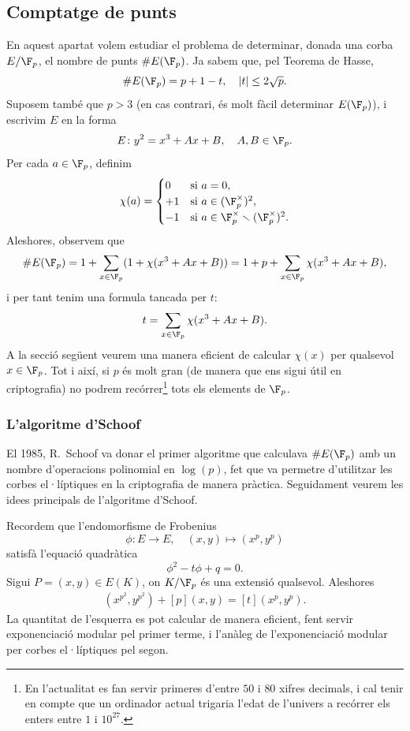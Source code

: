  \subsection{Comptatge de punts}
 En aquest apartat volem estudiar el problema de determinar, donada una corba $E/\F_p$, el nombre de punts $\# E(\F_p)$. Ja sabem que, pel Teorema de Hasse,
 \[
 \# E(\F_p) = p + 1 - t,\quad |t|\leq 2\sqrt{p}.
 \]
 Suposem també que $p>3$ (en cas contrari, és molt fàcil determinar $E(\F_p)$), i escrivim $E$ en la forma
 \[
 E\colon y^2=x^3+Ax+B, \quad A,B\in\F_p.
 \]
 Per cada $a\in \F_p$, definim
 \[
 \chi(a)=\begin{cases}
 0&\text{si } a=0,\\
 +1&\text{si } a\in(\F_p^\times)^2,\\
 -1&\text{si } a\in \F_p^\times\smallsetminus (\F_p^\times)^2.
 \end{cases}
 \]
 Aleshores, observem que
 \[
 \# E(\F_p) = 1+ \sum_{x\in\F_p} (1+\chi(x^3+Ax+B))= 1+p+\sum_{x\in\F_p} \chi(x^3+Ax+B),
 \]
 i per tant tenim una formula tancada per $t$:
 \[
 t = \sum_{x\in\F_p}\chi(x^3+Ax+B).
 \]
 A la secció següent veurem una manera eficient de calcular $\chi(x)$ per qualsevol $x\in\F_p$. Tot i així, si $p$ és molt gran (de manera que ens sigui útil en criptografia) no podrem recórrer\footnote{En l'actualitat es fan servir primeres d'entre $50$ i $80$ xifres decimals, i cal tenir en compte que un ordinador actual trigaria l'edat de l'univers a recórrer els enters entre $1$ i $10^{27}$.} tots els elements de $\F_p$.
 
 \subsubsection{L'algoritme d'Schoof}
 El 1985, R.~Schoof va donar el primer algoritme que calculava $\#E(\F_p)$ amb un nombre d'operacions polinomial en $\log(p)$, fet que va permetre d'utilitzar les corbes el·líptiques en la criptografia de manera pràctica. Seguidament veurem les idees principals de l'algoritme d'Schoof.
 
 Recordem que l'endomorfisme de Frobenius
 \[
 \phi\colon E\to E,\quad (x,y)\mapsto (x^p,y^p)
 \]
 satisfà l'equació quadràtica
 \[
 \phi^2-t\phi+q = 0.
 \]
 Sigui $P=(x,y)\in E(K)$, on $K/\F_p$ és una extensió qualsevol. Aleshores
 \begin{align}
 \label{eq:frobenius-schoof}
 (x^{p^2},y^{p^2}) + [p] (x,y) = [t] (x^p,y^p).
 \end{align}
 La quantitat de l'esquerra es pot calcular de manera eficient, fent servir exponenciació modular pel primer terme, i l'anàleg de l'exponenciació modular per corbes el·líptiques pel segon.
 
